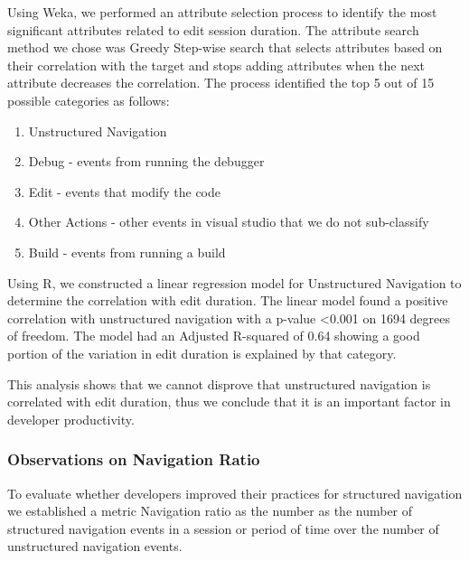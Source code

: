 \documentclass{sig-alternate}
\begin{document}
Using Weka\cite{Hall2009WEKA}, we performed an attribute selection process to identify the most significant attributes related to edit session duration.  The attribute search method we chose was Greedy Step-wise search that selects attributes based on their correlation with the target and stops adding attributes when the next attribute decreases the correlation.    The process identified the top 5 out of 15 possible categories as follows:
\begin{enumerate}[itemsep=0mm]
\item Unstructured Navigation
\item Debug - events from running the debugger
\item Edit - events that modify the code
\item Other Actions - other events in visual studio that we do not sub-classify
\item Build - events from running a build
\end{enumerate}

Using R\cite{Rcitation}, we constructed a linear regression model for Unstructured Navigation to determine the correlation with edit duration.  The linear model found a positive correlation with unstructured navigation with a p-value <0.001 on 1694 degrees of freedom.  The model had an Adjusted R-squared of 0.64 showing a good portion of the variation in edit duration is explained by that category. 

This analysis shows that we cannot disprove that unstructured navigation is correlated with edit duration, thus we conclude that it is an important factor in developer productivity.  

\subsubsection{Observations on Navigation Ratio}

To evaluate whether developers improved their practices for structured navigation we established a metric Navigation ratio as the number as the number of structured navigation events in a session or period of time over the number of unstructured navigation events.  
\end{document}
